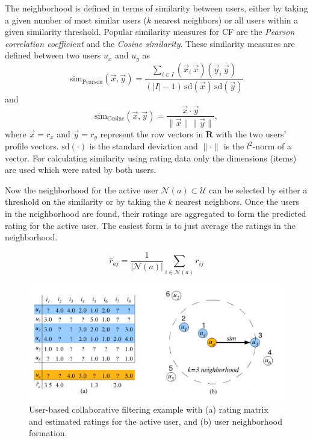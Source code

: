 \documentclass[nojss]{jss}
\newcommand{\set}[1]{\mathcal{#1}}
\newcommand{\mat}[1]{{\mathbf{#1}}}
\begin{document}
The neighborhood is defined in terms of similarity between users,
either by taking a given number of most similar users ($k$ nearest neighbors) 
or all users within
a given similarity threshold.
Popular similarity measures for CF are
the \emph{Pearson correlation coefficient} and
the \emph{Cosine similarity}. These similarity measures are defined
between two users $u_x$ and $u_y$ as
\begin{equation}
\mathrm{sim_{Pearson}}(\vec{x},\vec{y}) = 
	    \frac{\sum_{i \in I} (\vec{x}_i \, \bar{\vec{x}})(\vec{y}_i \, \bar{\vec{y}})}
		{(|I| -1) \, \mathrm{sd}(\vec{x}) \, \mathrm{sd}(\vec{y})}
\end{equation}
and
\begin{equation}
\mathrm{sim_{Cosine}}(\vec{x},\vec{y}) = 
	    \frac{\vec{x}\cdot\vec{y}}
		    {\|\vec{x}\| \|\vec{y}\|},
\end{equation}
where
$\vec{x} = r_{x}$ and 
$\vec{y} = r_{y}$ represent the 
row vectors in $\mat{R}$ with the 
two users' profile vectors.
$\mathrm{sd}(\cdot)$ is the standard deviation and
$\|\cdot\|$ is the $l^2$-norm of a vector.
For calculating similarity using rating data only the dimensions (items) 
are used which were rated by both users. 

Now the neighborhood for the active user $\set{N}(a) \subset \set{U}$ 
can be selected 
by either a threshold on the similarity or by taking the
$k$ nearest neighbors.
Once the users in the neighborhood are found, their ratings are  
aggregated to form the predicted rating for the active user.
The easiest form is to just average the ratings in the neighborhood.

\begin{equation}
\hat{r}_{aj}=\frac{1}{|\set{N}(a)|} \sum_{i\in\set{N}(a)} r_{ij}
\label{equ:aggregation1}
\end{equation}

\begin{figure}
\centerline{\includegraphics[width=13cm]{user-based}}
\caption{User-based collaborative filtering example with (a) rating matrix
and estimated ratings for the active user, and 
(b) user neighborhood formation.
}
\label{fig:UBCF}
\end{figure}
\end{document}
